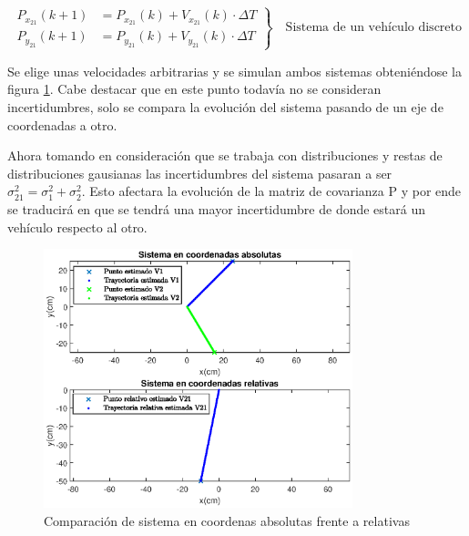 \begin{equation*}
\left.
 \begin{aligned}
P_{x_21}(k+1) & = P_{x_21}(k)+V_{x_21}(k)\cdot\Delta{T} \\
P_{y_21}(k+1) & = P_{y_21}(k)+V_{y_21}(k)\cdot\Delta{T} 
\end{aligned}
\right\}
\quad\text{Sistema de un vehículo discreto}
\end{equation*}
\par
Se elige unas velocidades arbitrarias y se simulan ambos sistemas obteniéndose la figura \ref{fig:2CarAbs-Rel}. Cabe destacar que en este punto todavía no se consideran incertidumbres, solo se compara la evolución del sistema pasando de un eje de coordenadas a otro.
\par 
Ahora tomando en consideración que se trabaja con distribuciones y restas de distribuciones gausianas las incertidumbres del sistema pasaran a ser $\sigma_{21}^2=\sigma_{1}^2+\sigma_{2}^2$. Esto afectara la evolución de la matriz de covarianza P y por ende se traducirá en que se tendrá una mayor incertidumbre de donde estará un vehículo respecto al otro. 
\newpage
\begin{figure}[htb]
\centering
\includegraphics[width=0.8\textwidth]{figures/Sistema2CarAbs-Rel.eps}
\caption{Comparación de sistema en coordenas absolutas frente a relativas} 
\label{fig:2CarAbs-Rel}
\end{figure}
\par 

